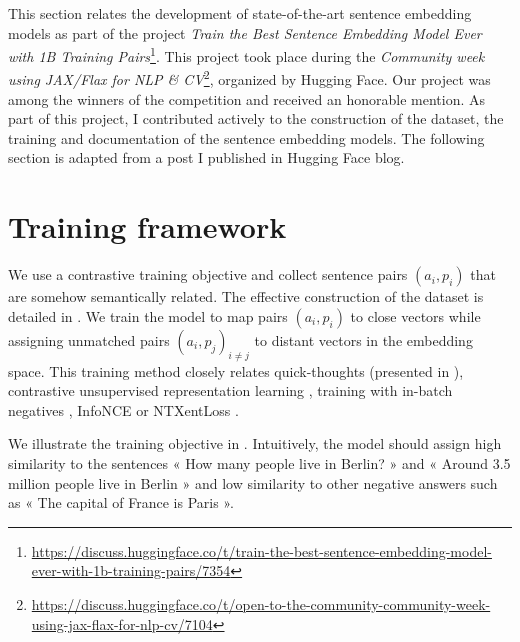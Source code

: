 
This section relates the development of state-of-the-art sentence embedding models as part of the project \textit{Train the Best Sentence Embedding Model Ever with 1B Training Pairs}\footnote{\url{https://discuss.huggingface.co/t/train-the-best-sentence-embedding-model-ever-with-1b-training-pairs/7354}}. This project took place during the \textit{Community week using JAX/Flax for NLP \& CV}\footnote{\url{https://discuss.huggingface.co/t/open-to-the-community-community-week-using-jax-flax-for-nlp-cv/7104}}, organized by Hugging Face. Our project was among the winners of the competition and received an honorable mention. As part of this project, I contributed actively to the construction of the dataset, the training and documentation of the sentence embedding models. The following section is adapted from a post I published in Hugging Face blog.

\section{Training framework}

We use a contrastive training objective and collect sentence pairs $(a_i, p_i)$ that are somehow semantically related. The effective construction of the dataset is detailed in . We train the model to map pairs $(a_i , p_i)$ to close vectors while assigning unmatched pairs $(a_i , p_j)_{i \neq j}$ to distant vectors in the embedding space. This training method closely relates quick-thoughts (presented in ), contrastive unsupervised representation learning \parencite{saunshi_19}, training with in-batch negatives \parencite{carlsson_21}, InfoNCE \parencite{oord_18} or NTXentLoss \parencite{sohn_16}.

We illustrate the training objective in . Intuitively, the model should assign high similarity to the sentences « How many people live in Berlin? » and « Around 3.5 million people live in Berlin » and low similarity to other negative answers such as « The capital of France is Paris ».

